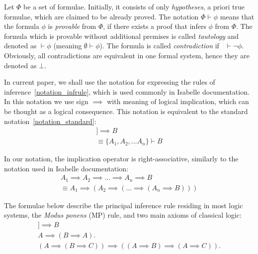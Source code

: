 \documentclass[article]{aaltoseries}
\begin{document}
Let $\Phi$ be a set of formulae. Initially, it consists of only \textit{hypotheses}, a priori true formulae, which are claimed to be already proved. The notation $\Phi \vdash \phi$ means that the formula $\phi$ is \textit{provable} from $\Phi$, if there exists a proof that infers $\phi$ from $\Phi$. The formula which is provable without additional premises is called \textit{tautology} and denoted as $ \vdash \phi $ (meaning $\emptyset \vdash \phi$). The formula is called \textit{contradiction} if \ $\vdash \neg \phi$. Obviously, all contradictions are equivalent in one formal system, hence they are denoted as $\bot$.

In current paper, we shall use the notation for expressing the rules of inference~\eqref{notation_infrule}, which is used commonly in Isabelle documentation. In this notation we use sign $\implies$ with meaning of logical implication, which can be thought as a logical consequence. This notation is equivalent to the standard notation~\eqref{notation_standard}:
\begin{gather}
[\![ A_{1}; A_{2}; \dots A_{n} ]\!] \implies B 
    \label{notation_infrule}\\
\equiv \{ A_{1}, A_{2}, \dots A_{n} \} \vdash B
    \label{notation_standard}
\end{gather}

In our notation, the implication operator is right-associative, similarly to the notation used in Isabelle documentation:
\begin{gather}
A_{1} \implies A_{2} \implies \dots \implies A_{n} \implies B \\
\equiv A_{1} \implies ( A_{2} \implies ( \dots \implies ( A_{n} \implies B)))
\end{gather}


The formulae below describe the principal inference rule residing in most logic systems, the \textit{Modus ponens} (MP) rule, and two main axioms of classical logic:
\begin{gather}
[\![ A, A \implies B ]\!] \implies B
    \label{rule_modus_ponens}\tag{MP} \\
%
A \implies (B \implies A).
	\label{axiom_hilbert_1}\tag{A1} \\
%
(A \implies (B \implies C)) \implies ((A \implies B) \implies (A \implies C)).
	\label{axiom_hilbert_2}\tag{A2}
\end{gather}
\end{document}
